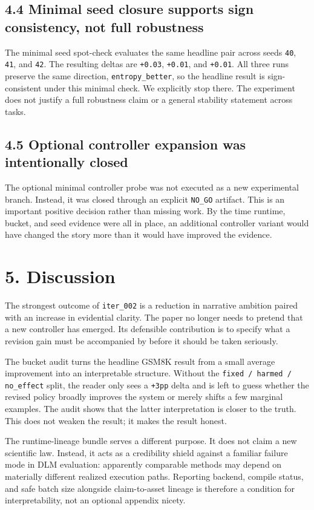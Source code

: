 \documentclass{article}
\begin{document}
\subsection{4.4 Minimal seed closure supports sign consistency, not full robustness}

The minimal seed spot-check evaluates the same headline pair across seeds \texttt{40}, \texttt{41}, and \texttt{42}. The resulting deltas are \texttt{+0.03}, \texttt{+0.01}, and \texttt{+0.01}. All three runs preserve the same direction, \texttt{entropy\_better}, so the headline result is sign-consistent under this minimal check. We explicitly stop there. The experiment does not justify a full robustness claim or a general stability statement across tasks.

\subsection{4.5 Optional controller expansion was intentionally closed}

The optional minimal controller probe was not executed as a new experimental branch. Instead, it was closed through an explicit \texttt{NO\_GO} artifact. This is an important positive decision rather than missing work. By the time runtime, bucket, and seed evidence were all in place, an additional controller variant would have changed the story more than it would have improved the evidence.

\section{5. Discussion}

The strongest outcome of \texttt{iter\_002} is a reduction in narrative ambition paired with an increase in evidential clarity. The paper no longer needs to pretend that a new controller has emerged. Its defensible contribution is to specify what a revision gain must be accompanied by before it should be taken seriously.

The bucket audit turns the headline GSM8K result from a small average improvement into an interpretable structure. Without the \texttt{fixed / harmed / no\_effect} split, the reader only sees a \texttt{+3pp} delta and is left to guess whether the revised policy broadly improves the system or merely shifts a few marginal examples. The audit shows that the latter interpretation is closer to the truth. This does not weaken the result; it makes the result honest.

The runtime-lineage bundle serves a different purpose. It does not claim a new scientific law. Instead, it acts as a credibility shield against a familiar failure mode in DLM evaluation: apparently comparable methods may depend on materially different realized execution paths. Reporting backend, compile status, and safe batch size alongside claim-to-asset lineage is therefore a condition for interpretability, not an optional appendix nicety.
\end{document}
